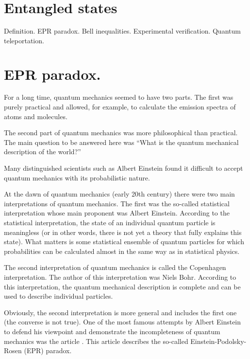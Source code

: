 \section{Entangled states}
Definition. EPR paradox. Bell inequalities. Experimental
verification. Quantum teleportation.

\section{EPR paradox.}

For a long time, quantum mechanics seemed to have two parts. The first was purely practical and allowed, for example, to calculate
the emission spectra of atoms and molecules. 

The second part of quantum mechanics was more philosophical than
practical. The main question to be answered here was 
“What is the quantum mechanical description of the world?”

Many distinguished scientists such as Albert Einstein found it difficult to accept
quantum mechanics with its probabilistic nature. 

At the dawn of quantum mechanics (early 20th century)
there were two main interpretations of quantum mechanics. The first was 
the so-called statistical interpretation whose main proponent was Albert Einstein. According to the statistical interpretation,
the state of an individual quantum particle is meaningless (or in other words, there is not yet a theory that fully explains this
state). What matters is some statistical ensemble
of quantum particles for which probabilities can be calculated almost
in the same way as in statistical physics. 

The second interpretation of quantum mechanics is called the Copenhagen
interpretation. The author of this interpretation was Niels Bohr. According to this interpretation, the quantum mechanical
description is complete and can be used to describe
individual particles.

Obviously, the second interpretation is more general and includes
the first one (the converse is not true). One of the most famous attempts
by Albert Einstein to defend his viewpoint and demonstrate the incompleteness
of quantum mechanics was the article \cite{bEPR}. This article describes the so-called
Einstein-Podolsky-Rosen (EPR) paradox. 

